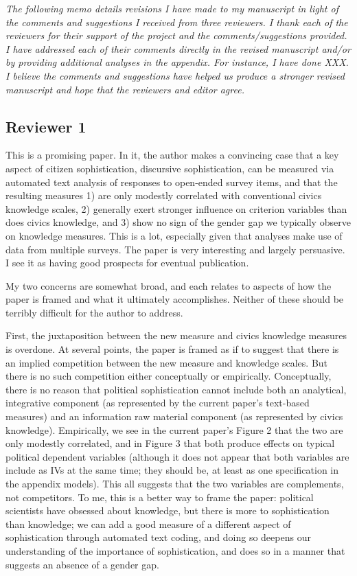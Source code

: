 \textit{The following memo details revisions I have made to my manuscript in light of the comments and suggestions I received from three reviewers.  I thank each of the reviewers for their support of the project and the comments/suggestions provided. I have addressed each of their comments directly in the revised manuscript and/or by providing additional analyses in the appendix.  For instance, I have done XXX. I believe the comments and suggestions have helped us produce a stronger revised manuscript and hope that the reviewers and editor agree.}

\subsection*{Reviewer 1}

This is a promising paper. In it, the author makes a convincing case that a key aspect of citizen sophistication, discursive sophistication, can be measured via automated text analysis of responses to open-ended survey items, and that the resulting measures 1) are only modestly correlated with conventional civics knowledge scales, 2) generally exert stronger influence on criterion variables than does civics knowledge, and 3) show no sign of the gender gap we typically observe on knowledge measures. This is a lot, especially given that analyses make use of data from multiple surveys. The paper is very interesting and largely persuasive. I see it as having good prospects for eventual publication.

My two concerns are somewhat broad, and each relates to aspects of how the paper is framed and what it ultimately accomplishes. Neither of these should be terribly difficult for the author to address.

First, the juxtaposition between the new measure and civics knowledge measures is overdone. At several points, the paper is framed as if to suggest that there is an implied competition between the new measure and knowledge scales. But there is no such competition either conceptually or empirically. Conceptually, there is no reason that political sophistication cannot include both an analytical, integrative component (as represented by the current paper's text-based measures) and an information raw material component (as represented by civics knowledge). Empirically, we see in the current paper's Figure 2 that the two are only modestly correlated, and in Figure 3 that both produce effects on typical political dependent variables (although it does not appear that both variables are include as IVs at the same time; they should be, at least as one specification in the appendix models). This all suggests that the two variables are complements, not competitors. To me, this is a
better way to frame the paper: political scientists have obsessed about knowledge, but there is more to sophistication than knowledge; we can add a good measure of a different aspect of sophistication through automated text coding, and doing so deepens our understanding of the importance of sophistication, and does so in a manner that suggests an absence of a gender gap. 


